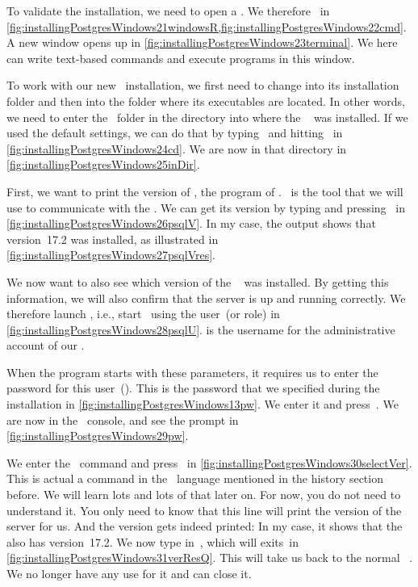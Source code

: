 To validate the installation, we need to open a .
We therefore \windowsTerminal\ in \cref{fig:installingPostgresWindows21windowsR,fig:installingPostgresWindows22cmd}.
A new  window opens up in \cref{fig:installingPostgresWindows23terminal}.
We here can write text-based commands and execute programs in this window.

To work with our new \postgresql\ installation, we first need to change into its installation folder and then into the folder where its executables are located.
In other words, we need to enter the ~folder in the directory into where the \postgresql\  was installed.
If we used the default settings, we can do that by typing~ and hitting~\keys{\return} in \cref{fig:installingPostgresWindows24cd}.
We are now in that directory in \cref{fig:installingPostgresWindows25inDir}.

First, we want to print the version of \psql, the  program of \postgresql.
\psql\ is the tool that we will use to communicate with the .
We can get its version by typing  and pressing~\keys{\return} in \cref{fig:installingPostgresWindows26psqlV}.
In my case, the output shows that version~17.2 was installed, as illustrated in \cref{fig:installingPostgresWindows27psqlVres}.

We now want to also see which version of the \postgresql\  was installed.
By getting this information, we will also confirm that the server is up and running correctly.
We therefore launch , i.e., start \psql\ using the user~(or role)  in \cref{fig:installingPostgresWindows28psqlU}.
 is the username for the administrative account of our .

When the program starts with these parameters, it requires us to enter the password for this user~().
This is the password that we specified during the installation in \cref{fig:installingPostgresWindows13pw}.
We enter it and press~\keys{\return}.
We are now in the \psql\ console, and see the  prompt in \cref{fig:installingPostgresWindows29pw}.

We enter the \sql\ command  and press~\keys{\return} in \cref{fig:installingPostgresWindows30selectVer}.
This is actual a command in the \sql\ language mentioned in the history section before.
We will learn lots and lots of that later on.
For now, you do not need to understand it.
You only need to know that this line will print the version of the server for us.
And the version gets indeed printed:
In my case, it shows that the \postgresql\  also has version~17.2.
We now type in~, which will exits~\psql in \cref{fig:installingPostgresWindows31verResQ}.
This will take us back to the normal \microsoftWindows\ .
We no longer have any use for it and can close it.

